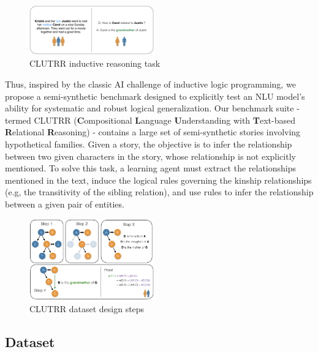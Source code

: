 \documentclass[12pt]{article}
\begin{document}
\begin{figure}
\begin{center}
  \includegraphics[width=0.48\textwidth]{images/clutrr_text.png}
\end{center}
\caption{CLUTRR inductive reasoning task}
\label{fig:clutrr_data}
\end{figure}



Thus, inspired by the classic AI challenge of inductive logic programming, we propose a semi-synthetic benchmark designed to explicitly test an NLU model's ability for systematic and robust logical generalization. Our benchmark suite - termed CLUTRR (\textbf{C}ompositional \textbf{L}anguage \textbf{U}nderstanding with \textbf{T}ext-based \textbf{R}elational \textbf{R}easoning) - contains a large set of semi-synthetic stories involving hypothetical families. Given a story, the objective is to infer the relationship between two given characters in the story, whose relationship is not explicitly mentioned. To solve this task, a learning agent must extract the relationships mentioned in the text, induce the logical rules governing the kinship relationships (e.g, the transitivity of the sibling relation), and use rules to infer the relationship between a given pair of entities.

\begin{figure}
\begin{center}
  \includegraphics[width=0.48\textwidth]{images/clutrr_dataset_proof.png}
\end{center}
\caption{CLUTRR dataset design steps}
\label{fig:clutrr_data_design}
\end{figure}

\subsection{Dataset}
\end{document}
